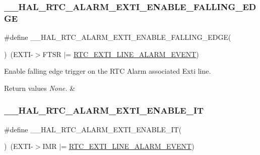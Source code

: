 \subsubsection{\texorpdfstring{\+\_\+\+\_\+\+H\+A\+L\+\_\+\+R\+T\+C\+\_\+\+A\+L\+A\+R\+M\+\_\+\+E\+X\+T\+I\+\_\+\+E\+N\+A\+B\+L\+E\+\_\+\+F\+A\+L\+L\+I\+N\+G\+\_\+\+E\+D\+GE}{\_\_HAL\_RTC\_ALARM\_EXTI\_ENABLE\_FALLING\_EDGE}}
{\footnotesize\ttfamily \#define \+\_\+\+\_\+\+H\+A\+L\+\_\+\+R\+T\+C\+\_\+\+A\+L\+A\+R\+M\+\_\+\+E\+X\+T\+I\+\_\+\+E\+N\+A\+B\+L\+E\+\_\+\+F\+A\+L\+L\+I\+N\+G\+\_\+\+E\+D\+GE(\begin{DoxyParamCaption}{ }\end{DoxyParamCaption})~(E\+X\+TI-\/$>$F\+T\+SR $\vert$= \hyperlink{group___r_t_c___private___constants_gaeffe9b89372b06df1c0eff2f4346682b}{R\+T\+C\+\_\+\+E\+X\+T\+I\+\_\+\+L\+I\+N\+E\+\_\+\+A\+L\+A\+R\+M\+\_\+\+E\+V\+E\+NT})}



Enable falling edge trigger on the R\+TC Alarm associated Exti line. 


\begin{DoxyRetVals}{Return values}
{\em None.} & \\
\hline
\end{DoxyRetVals}
\mbox{\label{group___r_t_c___exported___macros_ga47fd0b2d9a8679d49ae554d482231780}} 
\subsubsection{\texorpdfstring{\+\_\+\+\_\+\+H\+A\+L\+\_\+\+R\+T\+C\+\_\+\+A\+L\+A\+R\+M\+\_\+\+E\+X\+T\+I\+\_\+\+E\+N\+A\+B\+L\+E\+\_\+\+IT}{\_\_HAL\_RTC\_ALARM\_EXTI\_ENABLE\_IT}}
{\footnotesize\ttfamily \#define \+\_\+\+\_\+\+H\+A\+L\+\_\+\+R\+T\+C\+\_\+\+A\+L\+A\+R\+M\+\_\+\+E\+X\+T\+I\+\_\+\+E\+N\+A\+B\+L\+E\+\_\+\+IT(\begin{DoxyParamCaption}{ }\end{DoxyParamCaption})~(E\+X\+TI-\/$>$I\+MR $\vert$= \hyperlink{group___r_t_c___private___constants_gaeffe9b89372b06df1c0eff2f4346682b}{R\+T\+C\+\_\+\+E\+X\+T\+I\+\_\+\+L\+I\+N\+E\+\_\+\+A\+L\+A\+R\+M\+\_\+\+E\+V\+E\+NT})}



